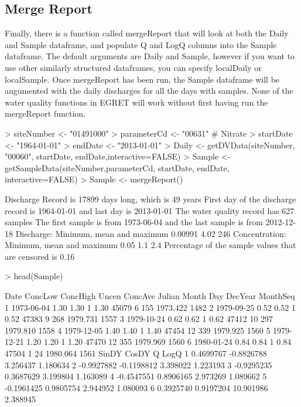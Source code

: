 \documentclass[a4paper,11pt]{article}
\begin{document}
\FloatBarrier
\subsection{Merge Report}
Finally, there is a function called mergeReport that will look at both the Daily and Sample dataframe, and populate Q and LogQ columns into the Sample dataframe. The default arguments are Daily and Sample, however if you want to use other similarly structured dataframes, you can specify localDaily or localSample. Once mergeReport has been run, the Sample dataframe will be augumented with the daily discharges for all the days with samples.  None of the water quality functions in EGRET will work without first having run the mergeReport function.


\begin{Schunk}
\begin{Sinput}
> siteNumber <- "01491000"
> parameterCd <- "00631"  # Nitrate
> startDate <- "1964-01-01"
> endDate <- "2013-01-01"
> Daily <- getDVData(siteNumber, "00060", startDate, endDate,interactive=FALSE)
> Sample <- getSampleData(siteNumber,parameterCd, startDate, endDate, interactive=FALSE)
> Sample <- mergeReport()
\end{Sinput}
\begin{Soutput}
 Discharge Record is 17899 days long, which is 49 years
 First day of the discharge record is 1964-01-01 and last day is 2013-01-01
 The water quality record has 627 samples
 The first sample is from 1973-06-04 and the last sample is from 2012-12-18
 Discharge: Minimum, mean and maximum 0.00991 4.02 246
 Concentration: Minimum, mean and maximum 0.05 1.1 2.4
 Percentage of the sample values that are censored is 0.16 %
\end{Soutput}
\begin{Sinput}
> head(Sample)
\end{Sinput}
\begin{Soutput}
        Date ConcLow ConcHigh Uncen ConcAve Julian Month Day  DecYear MonthSeq
1 1973-06-04    1.30     1.30     1    1.30  45079     6 155 1973.422     1482
2 1979-09-25    0.52     0.52     1    0.52  47383     9 268 1979.731     1557
3 1979-10-24    0.62     0.62     1    0.62  47412    10 297 1979.810     1558
4 1979-12-05    1.40     1.40     1    1.40  47454    12 339 1979.925     1560
5 1979-12-21    1.20     1.20     1    1.20  47470    12 355 1979.969     1560
6 1980-01-24    0.84     0.84     1    0.84  47504     1  24 1980.064     1561
       SinDY      CosDY         Q     LogQ
1  0.4699767 -0.8826788  3.256437 1.180634
2 -0.9927882 -0.1198812  3.398022 1.223193
3 -0.9295235  0.3687629  3.199804 1.163089
4 -0.4547551  0.8906165  2.973269 1.089662
5 -0.1961425  0.9805754  2.944952 1.080093
6  0.3925740  0.9197204 10.901986 2.388945
\end{Soutput}
\end{Schunk}
\end{document}
